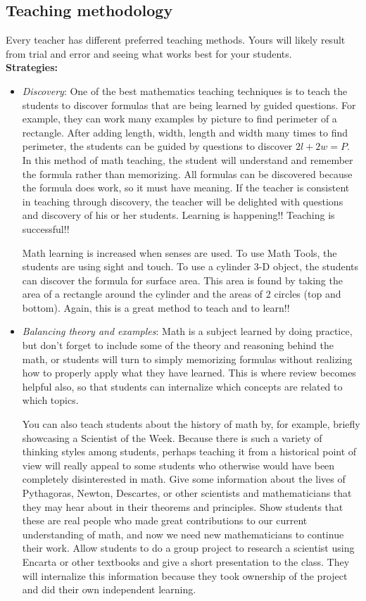 \subsection{Teaching methodology}
Every teacher has different preferred teaching methods. Yours will likely result from trial and error and seeing what works best for your students.\\

\textbf{Strategies:}
\begin{itemize}
\item\emph{Discovery}: One of the best mathematics teaching techniques is to teach the students to discover formulas that are being learned by guided questions. For example, they can work many examples by picture to find perimeter of a rectangle. After adding length, width, length and width many times to find perimeter, the students can be guided by questions to discover $2l + 2w = P$. In this method of math teaching, the student will understand and remember the formula rather than memorizing. All formulas can be discovered because the formula does work, so it must have meaning. If the teacher is consistent in teaching through discovery, the teacher will be delighted with questions and discovery of his or her students. Learning is happening!! Teaching is successful!! 

Math learning is increased when senses are used. To use Math Tools, the students are using sight and
touch. To use a cylinder 3-D object, the students can discover the formula for surface area. This area is
found by taking the area of a rectangle around the cylinder and the areas of 2 circles (top and bottom). Again, this is a great method to teach and to learn!!

\item\emph{Balancing theory and examples}: Math is a subject learned by doing practice, but don't forget to include some of the theory and reasoning behind the math, or students will turn to simply memorizing formulas without realizing how to properly apply what they have learned. This is where review becomes helpful also, so that students can internalize which concepts are related to which topics.

You can also teach students about the history of math by, for example, briefly showcasing a Scientist of the Week. Because there is such a variety of thinking styles among students, perhaps teaching it from a historical point of view will really appeal to some students who otherwise would have been completely disinterested in math. Give some information about the lives of Pythagoras, Newton, Descartes, or other scientists and mathematicians that they may hear about in their theorems and principles. Show students that these are real people who made great contributions to our current understanding of math, and now we need new mathematicians to continue their work. Allow students to do a group project to research a scientist using Encarta or other textbooks and give a short presentation to the class. They will internalize this information because they took ownership of the project and did their own independent learning.


\end{itemize}
